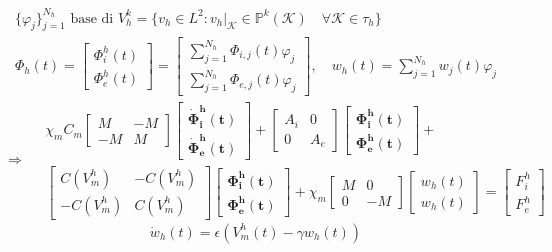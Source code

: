 \documentclass[a4paper]{article}
\begin{document}
\begin{equation*}
\begin{gathered}
\{\varphi_j\}_{j=1}^{N_h} \text{ base di } V_h^k = \{v_h \in L^2 : v_h|_\mathcal{K} \in \mathbb{P}^{k}(\mathcal{K})  \quad \forall \mathcal{K} \in \tau_h \}
\\
\Phi_h(t) = \begin{bmatrix} \Phi_i^h(t) \\ \Phi_e^h(t) \end{bmatrix} = \begin {bmatrix}\sum_{j=1}^{N_h} \Phi_{i,j}(t)\varphi_j \\ \sum_{j=1}^{N_h} \Phi_{e,j}(t)\varphi_j \end{bmatrix},
 \quad w_h(t) = \sum_{j=1}^{N_h}w_j(t)\varphi_j
\end{gathered}
\end{equation*}
\vspace{3mm}
\begin{equation}\label{ref5}
\Rightarrow \quad
\boxed{
\begin{gathered}
 \chi_mC_m \begin{bmatrix}M &-M \\ -M & M \end{bmatrix}
	\begin{bmatrix}\bm{\dot{\Phi}_i^h(t)} \\ \bm{\dot{\Phi}_e^h(t)} \end{bmatrix}
	 + \begin{bmatrix}A_i & 0 \\ 0 & A_e \end{bmatrix}
	 \begin{bmatrix}\bm{\Phi_i^h(t)} \\ \bm{\Phi_e^h(t)} \end{bmatrix} +\\
	   \begin{bmatrix}C(V_m^h) & -C(V_m^h) \\ -C(V_m^h) & C(V_m^h) \end{bmatrix} 
	   \begin{bmatrix} \bm{\Phi_i^h(t)} \\ \bm{\Phi_e^h(t)}  \end{bmatrix} 
	   +\chi_m \begin{bmatrix}M & 0 \\ 0 & -M \end{bmatrix} 
	   	\begin{bmatrix}w_h(t) \\ w_h(t) \end{bmatrix} = 
	   	\begin{bmatrix} F_i^h \\ F_e^h\end{bmatrix}
\end{gathered}
}
\end{equation}
\begin{equation}
\boxed{\dot{w}_h(t) = \epsilon(V_m^h(t) - \gamma w_h(t))}
\end{equation}
\vspace{5mm}
\end{document}
